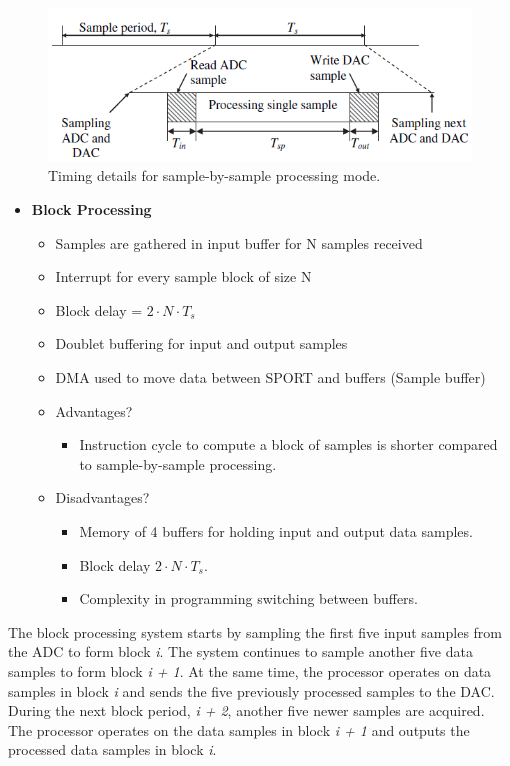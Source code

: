 \begin{figure} [H]
	\centering
	\includegraphics[width=0.8\linewidth]{graphics/19.png}
	\caption{Timing details for sample-by-sample processing mode.}
	\label{fig:19}
\end{figure}

\begin{itemize}
	\item \textbf{Block Processing}
	\begin{itemize}
		\item Samples are gathered in input buffer for N samples received
		\item Interrupt for every sample block of size N
		\item Block delay = $2\cdot N\cdot T_s$
		\item Doublet buffering for input and output samples
		\item DMA used to move data between SPORT and buffers (Sample buffer)
		\newpage \item Advantages?
		\begin{itemize}
			\item Instruction cycle to compute a block of samples is shorter compared to sample-by-sample processing.
		\end{itemize}
		\item Disadvantages?
		\begin{itemize}
			\item Memory of 4 buffers for holding input and output
			data samples.
			\item Block delay $2\cdot N\cdot T_s$.
			\item Complexity in programming switching between buffers.
		\end{itemize}
	\end{itemize}
\end{itemize}

The block processing system starts by sampling the first five input
samples from the ADC to form block \textit{i}. The system continues to sample another five data samples to form block \textit{i + 1}. At the same time, the processor operates on data samples in block \textit{i} and sends the five previously processed samples to the DAC. During the next block period, \textit{i + 2}, another five newer samples are acquired. The processor operates on the data samples in block \textit{i + 1} and outputs the processed data samples in block \textit{i}.

